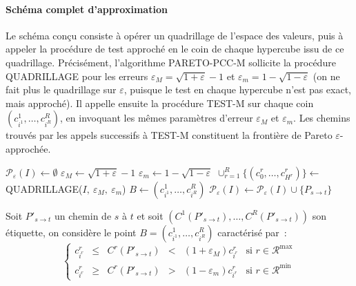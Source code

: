 \documentclass[10pt,francais]{llncs}
\begin{document}
{\paragraph{Sch\'ema complet d'approximation}
Le sch\'ema con\c{c}u consiste \`a op\'erer un quadrillage de l'espace des valeurs, puis \`a appeler la proc\'edure de test approch\'e en le  coin de chaque hypercube issu de ce quadrillage. Pr\'ecis\'ement, l'algorithme PARETO-PCC-M sollicite la proc\'edure QUADRILLAGE  pour les erreurs $\varepsilon_M=\sqrt{1+\varepsilon}-1$ et $\varepsilon_m= 1-\sqrt{1-\varepsilon}$ (on ne fait plus le quadrillage sur $\varepsilon$, puisque le test en chaque hypercube n'est pas exact, mais approch\'e). Il appelle ensuite la proc\'edure TEST-M sur chaque coin $(c^1_{i^1},\ldots,c^R_{i^R})$, en invoquant les m\^emes param\`etres d'erreur $\varepsilon_M$ et $\varepsilon_m$. Les chemins trouv\'es par les appels successifs \`a TEST-M constituent la fronti\`ere de Pareto $\varepsilon$-approch\'ee.

\begin{algorithm}\label{algo-pareto-pcc-m}
\caption{PARETO-PCC-M~: Fronti\`ere de Pareto $\varepsilon$-approch\'ee en temps polynomial}
\Entree{$I$ instance, $\varepsilon\in]0,1[$ erreur}
\BlankLine
{}
\BlankLine
$\mathscr{P}_\varepsilon(I) \leftarrow \emptyset$\;
$\varepsilon_M \leftarrow \sqrt{1+\varepsilon}-1$\;
$\varepsilon_m \leftarrow 1-\sqrt{1-\varepsilon}$\;
$\cup_{r=1}^R\{(c^r_0,\ldots,c^r_{H^r})\} \leftarrow$ QUADRILLAGE($I,\ \varepsilon_M,\ \varepsilon_m$)\;
{
	$B\leftarrow (c^1_{i^1},\ldots,c^R_{i^R})$\;
		{$\mathscr{P}_\varepsilon(I) \leftarrow \mathscr{P}_\varepsilon(I)\cup\{P_{s \to t}\}$\;} 
}
\end{algorithm}


Soit $P'_{s \to t}$ un chemin de $s$ \`a $t$ et soit $\left(C^1(P'_{s \to t}),\ldots,C^R(P'_{s \to t})\right)$ son \'etiquette, on consid\`ere le point $B=\left(c^1_{i^1},\ldots,c^R_{i^R}\right)$ caract\'eris\'e par~: 
$$\left\{\begin{array}{lclclc}
			c^r_{i^r} 	&\leq &C^r(P'_{s \to t}) &< &(1+\varepsilon_M)c^{r}_{i^r} 	&\textrm{si } r\in \mathscr{R}^{\max}\\[7pt]
			c^r_{i^r} 	&\geq &C^r(P'_{s \to t}) &> &(1-\varepsilon_m)c^{r}_{i^r} 	&\textrm{si } r\in \mathscr{R}^{\min}
	\end{array}\right.$$

}
\end{document}
